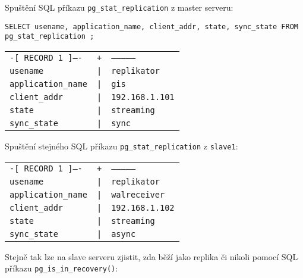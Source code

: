Spuštění SQL příkazu \texttt{pg\_stat\_replication} z master serveru:

\begin{lstlisting}
SELECT usename, application_name, client_addr, state, sync_state FROM pg_stat_replication ;
\end{lstlisting}

    \begin{table}[H]
      \label{pgHba}
        \begin{center}
          \begin{tabular}{lll}
            \texttt{-[ RECORD 1 ]----} & \texttt{+} & \texttt{--------------}\\
                      \texttt{usename} &           \texttt{|} &  \texttt{replikator}\\
            \texttt{application\_name} &  \texttt{|} &  \texttt{gis}\\
                 \texttt{client\_addr} &       \texttt{|} &  \texttt{192.168.1.101}\\
                        \texttt{state} &             \texttt{|} &  \texttt{streaming}\\
                  \texttt{sync\_state} &        \texttt{|} &  \texttt{sync}\\
          \end{tabular}
        \end{center}
    \end{table}

Spuštění stejného SQL příkazu \texttt{pg\_stat\_replication} z \texttt{slave1}:

    \begin{table}[H]
      \label{pgHba}
        \begin{center}
          \begin{tabular}{lll}
            \texttt{-[ RECORD 1 ]----} & \texttt{+} & \texttt{--------------}\\
                      \texttt{usename} &           \texttt{|} &  \texttt{replikator}\\
            \texttt{application\_name} &  \texttt{|} &  \texttt{walreceiver}\\
                 \texttt{client\_addr} &       \texttt{|} &  \texttt{192.168.1.102}\\
                        \texttt{state} &             \texttt{|} &  \texttt{streaming}\\
                  \texttt{sync\_state} &        \texttt{|} &  \texttt{async}\\
          \end{tabular}
        \end{center}
    \end{table}
Stejně tak lze na slave serveru zjistit, zda běží jako replika či nikoli pomocí SQL příkazu \texttt{pg\_is\_in\_recovery()}:

